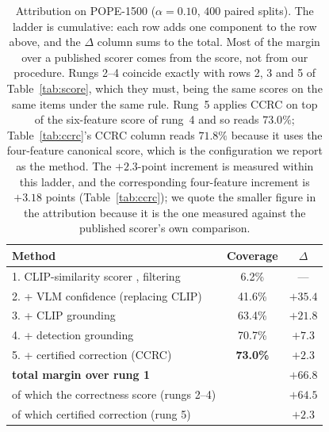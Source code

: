 \documentclass[review,number,doubleblind]{elsarticle}
\theoremstyle{plain}
\theoremstyle{definition}
\theoremstyle{remark}
\begin{document}
\begin{table}[t]
\centering
\caption{Attribution on POPE-1500 ($\alpha=0.10$, $400$ paired splits). The ladder is cumulative:
each row adds one component to the row above, and the $\Delta$ column sums to the total. Most of
the margin over a published scorer comes from the score, not from our procedure. Rungs 2--4
coincide exactly with rows 2, 3 and 5 of Table~\ref{tab:score}, which they must, being the same
scores on the same items under the same rule. Rung~5 applies CCRC on top of the six-feature score
of rung~4 and so reads $73.0\%$; Table~\ref{tab:ccrc}'s CCRC column reads $71.8\%$ because it uses
the four-feature canonical score, which is the configuration we report as the method. The
$+2.3$-point increment is measured within this ladder, and the corresponding four-feature
increment is $+3.18$ points (Table~\ref{tab:ccrc}); we quote the smaller figure in the
attribution because it is the one measured against the published scorer's own comparison.}
\label{tab:attrib}
\begin{tabular}{lcc}
\toprule
Method & Coverage & $\Delta$\\
\midrule
1. CLIP-similarity scorer \citep{conflvlm}, filtering & \phantom{0}6.2\%  & ---\\
2. \quad + VLM confidence (replacing CLIP)         & 41.6\% & $+35.4$\\
3. \quad + CLIP grounding                          & 63.4\% & $+21.8$\\
4. \quad + detection grounding                     & 70.7\% & $+7.3$\\
5. \quad + certified correction (CCRC)             & \textbf{73.0\%} & $+2.3$\\
\midrule
\textbf{total margin over rung 1}                  & & $\mathbf{+66.8}$\\
\quad of which the correctness score (rungs 2--4)  & & $+64.5$\\
\quad of which certified correction (rung 5)       & & $+2.3$\\
\bottomrule
\end{tabular}
\end{table}
\end{document}
